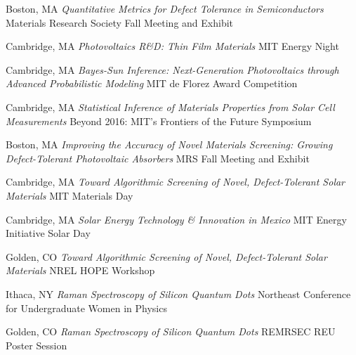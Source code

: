 \vspace{\talkyearsep}
    {Boston, MA}
    {\textit{Quantitative Metrics for Defect Tolerance in Semiconductors}}
    {Materials Research Society Fall Meeting and Exhibit}

\vspace{\talksep}
\datedsubsection{}
    {Cambridge, MA}
    {\textit{Photovoltaics R\&D: Thin Film Materials}}
    {MIT Energy Night}

\vspace{\talksep}
\datedsubsection{}
    {Cambridge, MA}
    {\textit{Bayes-Sun Inference: Next-Generation Photovoltaics through Advanced Probabilistic Modeling}}
    {MIT de Florez Award Competition}

\vspace{\talksep}
\datedsubsection{}
    {Cambridge, MA}
    {\textit{Statistical Inference of Materials Properties from Solar Cell Measurements}}
    {Beyond 2016: MIT’s Frontiers of the Future Symposium}

\vspace{\talkyearsep}
    {Boston, MA}
    {\textit{Improving the Accuracy of Novel Materials Screening: Growing Defect-Tolerant Photovoltaic Absorbers}}
    {MRS Fall Meeting and Exhibit}

\vspace{\talksep}
\datedsubsection{}
    {Cambridge, MA}
    {\textit{Toward Algorithmic Screening of Novel, Defect-Tolerant Solar Materials}}
    {MIT Materials Day}

\vspace{\talksep}
\datedsubsection{}
    {Cambridge, MA}
    {\textit{Solar Energy Technology \& Innovation in Mexico}}
    {MIT Energy Initiative Solar Day}

\vspace{\talksep}
\datedsubsection{}
    {Golden, CO}
    {\textit{Toward Algorithmic Screening of Novel, Defect-Tolerant Solar Materials}}
    {NREL HOPE Workshop}

\vspace{\talkyearsep}
    {Ithaca, NY}
    {\textit{Raman Spectroscopy of Silicon Quantum Dots}}
    {Northeast Conference for Undergraduate Women in Physics}

\vspace{\talkyearsep}
    {Golden, CO}
    {\textit{Raman Spectroscopy of Silicon Quantum Dots}}
    {REMRSEC REU Poster Session}
